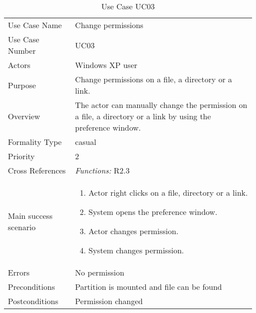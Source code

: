 \begin{longtable}{|p{4cm} X|}
\caption{\label{tab:useCase03}Use Case UC03}\\
\hline
Use Case Name 					&Change permissions\\
Use Case Number					&UC03\\
Actors							&Windows XP user\\
Purpose							&Change permissions on a file, a directory or a link.\\
Overview						&The actor can manually change the permission on a file, a directory or a link by using the preference window.\\
Formality Type							&casual\\
Priority						&2\\
Cross References				&\textit{Functions:} R2.3\\ 
Main success scenario				&
\begin{enumerate}
\item Actor right clicks on a file, directory or a link.
\item System opens the preference window.
\item Actor changes permission.
\item System changes permission.
\end{enumerate}
\\
Errors							&No permission\\
Preconditions					&Partition is mounted and file can be found\\
Postconditions					&Permission changed\\
\hline
\end{longtable}
